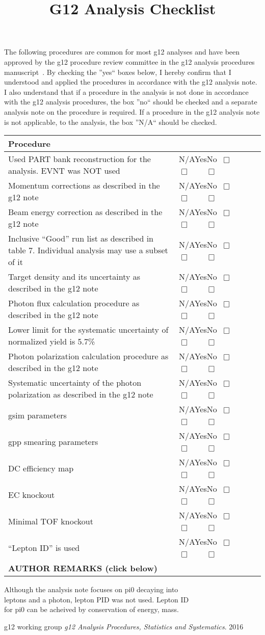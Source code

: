 \documentclass[11pt]{article} %
\title{G12 Analysis Checklist}
\date{\vspace{-10ex}}
\newcommand{\yesno}{\textsf{N/A}\hskip11pt\textsf{Yes}\hskip11pt\textsf{No}\hskip11pt{\Large ~$\Box$}~~~~ {\Large ~$\Box$}~~~~{\Large $\Box$}}
\newcommand{\question}[1]{

		\textsf{#1} &{\small\yesno} \\ \hline%
}
\newcommand{\heading}[1]{%
	\multicolumn{2}{l|}{\bf\textsf{#1}}\\ \hline %
}
\begin{document}
	\maketitle
		\thispagestyle{firststyle}
	The following procedures are common for most g12 analyses and have been approved by the g12 procedure review committee in the g12 analysis procedures manuscript~\cite{g12note}.
	By checking the ''yes`` boxes below, I hereby confirm that I understood and applied the procedures in accordance with the g12 analysis note. I also understand that if a procedure in the analysis is not done in accordance with the g12 analysis procedures, the box ''no`` should be checked and a separate analysis note on the procedure is required. If a procedure in the g12 analysis note is not applicable, to the analysis, the box ''N/A`` should be checked. 
	
	\begin{longtable}{|p{6.61cm}|p{3.1cm}|}
		\heading{Procedure}
        \question{Used PART bank reconstruction for the analysis. EVNT was NOT used}
       \question{Momentum corrections as described in the g12 note}
		\question{Beam energy correction as described in the g12 note}
		\question{Inclusive “Good” run list as described in table 7. Individual analysis may use a subset of it}
		\question{Target density and its uncertainty as described in the g12 note}
		\question{Photon flux calculation procedure as described in the g12 note}
		\question{Lower limit for the systematic uncertainty of normalized yield is 5.7\%}
		\question{Photon polarization calculation procedure as described in the g12 note}
		\question{Systematic uncertainty of the photon polarization as described in the g12 note}
		\question{gsim parameters}
		\question{gpp smearing parameters}
		\question{DC efficiency map}
		\question{EC knockout}
		\question{Minimal TOF knockout}
		\question{“Lepton ID” is used}
		\hline%
		\multicolumn{2}{|l|}{\bf {\textsf{AUTHOR REMARKS}} (click below)}\\
	\end{longtable}
	\vspace{-0.75cm}
	\begin{Form}
		\begin{center}
		\centering
			\quad \quad Although the analysis note focuses on pi0 decaying into \\
			\quad \quad leptons and a photon, lepton PID was not used. Lepton ID \\
			\quad \quad for pi0 can be acheived by conservation of energy, mass.
		\end{center}
	\end{Form}
		\vspace{0.75cm}
	
	\begin{thebibliography}{9}
		g12 working group
		\textit{g12 Analysis Procedures, Statistics and Systematics}.
		2016
	\end{thebibliography}
	
	
\end{document}
